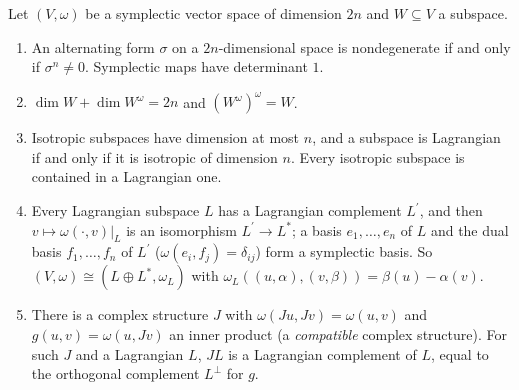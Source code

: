 \begin{proposition}\label{symplectic-geometry:proposition-linear}
Let $(V, \omega)$ be a symplectic vector space of dimension $2n$ and $W \subseteq V$ a subspace.
\begin{enumerate}
\item An alternating form $\sigma$ on a $2n$-dimensional space is nondegenerate if and only if $\sigma^n \neq 0$. Symplectic maps have determinant $1$.
\item $\dim W + \dim W^\omega = 2n$ and $(W^\omega)^\omega = W$.
\item Isotropic subspaces have dimension at most $n$, and a subspace is Lagrangian if and only if it is isotropic of dimension $n$. Every isotropic subspace is contained in a Lagrangian one.
\item Every Lagrangian subspace $L$ has a Lagrangian complement $L^{\prime}$, and then $v \mapsto \omega(\cdot, v)|_L$ is an isomorphism $L^{\prime} \to L^*$; a basis $e_1, \ldots, e_n$ of $L$ and the dual basis
$f_1, \ldots, f_n$ of $L^{\prime}$ ($\omega(e_i, f_j) = \delta_{ij}$) form a symplectic basis. So $(V, \omega) \cong (L \oplus L^*, \omega_L)$ with $\omega_L((u, \alpha), (v, \beta)) = \beta(u) - \alpha(v)$.
\item There is a complex structure $J$ with $\omega(Ju, Jv) = \omega(u, v)$ and $g(u, v) = \omega(u, Jv)$ an inner product (a \emph{compatible} complex structure). For such $J$ and a Lagrangian $L$,
$JL$ is a Lagrangian complement of $L$, equal to the orthogonal complement $L^\perp$ for $g$.
\end{enumerate}
\end{proposition}

